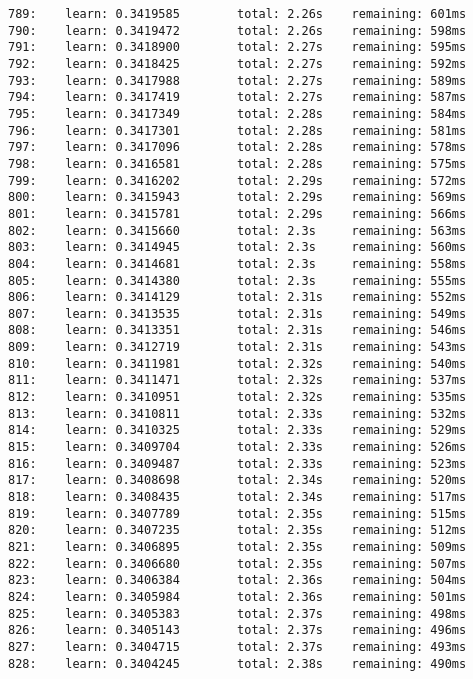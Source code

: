 \documentclass[11pt]{article}
\begin{document}
\begin{Verbatim}[commandchars=\\\{\}]
789:    learn: 0.3419585        total: 2.26s    remaining: 601ms
790:    learn: 0.3419472        total: 2.26s    remaining: 598ms
791:    learn: 0.3418900        total: 2.27s    remaining: 595ms
792:    learn: 0.3418425        total: 2.27s    remaining: 592ms
793:    learn: 0.3417988        total: 2.27s    remaining: 589ms
794:    learn: 0.3417419        total: 2.27s    remaining: 587ms
795:    learn: 0.3417349        total: 2.28s    remaining: 584ms
796:    learn: 0.3417301        total: 2.28s    remaining: 581ms
797:    learn: 0.3417096        total: 2.28s    remaining: 578ms
798:    learn: 0.3416581        total: 2.28s    remaining: 575ms
799:    learn: 0.3416202        total: 2.29s    remaining: 572ms
800:    learn: 0.3415943        total: 2.29s    remaining: 569ms
801:    learn: 0.3415781        total: 2.29s    remaining: 566ms
802:    learn: 0.3415660        total: 2.3s     remaining: 563ms
803:    learn: 0.3414945        total: 2.3s     remaining: 560ms
804:    learn: 0.3414681        total: 2.3s     remaining: 558ms
805:    learn: 0.3414380        total: 2.3s     remaining: 555ms
806:    learn: 0.3414129        total: 2.31s    remaining: 552ms
807:    learn: 0.3413535        total: 2.31s    remaining: 549ms
808:    learn: 0.3413351        total: 2.31s    remaining: 546ms
809:    learn: 0.3412719        total: 2.31s    remaining: 543ms
810:    learn: 0.3411981        total: 2.32s    remaining: 540ms
811:    learn: 0.3411471        total: 2.32s    remaining: 537ms
812:    learn: 0.3410951        total: 2.32s    remaining: 535ms
813:    learn: 0.3410811        total: 2.33s    remaining: 532ms
814:    learn: 0.3410325        total: 2.33s    remaining: 529ms
815:    learn: 0.3409704        total: 2.33s    remaining: 526ms
816:    learn: 0.3409487        total: 2.33s    remaining: 523ms
817:    learn: 0.3408698        total: 2.34s    remaining: 520ms
818:    learn: 0.3408435        total: 2.34s    remaining: 517ms
819:    learn: 0.3407789        total: 2.35s    remaining: 515ms
820:    learn: 0.3407235        total: 2.35s    remaining: 512ms
821:    learn: 0.3406895        total: 2.35s    remaining: 509ms
822:    learn: 0.3406680        total: 2.35s    remaining: 507ms
823:    learn: 0.3406384        total: 2.36s    remaining: 504ms
824:    learn: 0.3405984        total: 2.36s    remaining: 501ms
825:    learn: 0.3405383        total: 2.37s    remaining: 498ms
826:    learn: 0.3405143        total: 2.37s    remaining: 496ms
827:    learn: 0.3404715        total: 2.37s    remaining: 493ms
828:    learn: 0.3404245        total: 2.38s    remaining: 490ms

\end{Verbatim}
\end{document}
